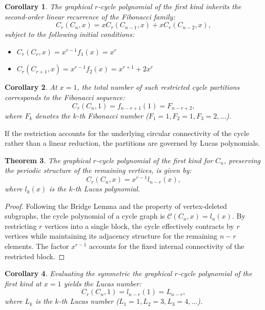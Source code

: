 \documentclass{amsart}
\newtheorem{theorem}{Theorem}[section]
\newtheorem{corollary}[theorem]{Corollary}
\theoremstyle{definition}
\begin{document}
\begin{corollary}
The graphical $r$-cycle polynomial of the first kind inherits the second-order linear recurrence of the Fibonacci family:
\begin{equation*}
    C_r(C_n, x) = x C_r(C_{n-1}, x) + x C_r(C_{n-2}, x),
\end{equation*}
subject to the following initial conditions:
\begin{itemize}
    \item $C_r(C_r, x) = x^{r-1} f_1(x) = x^r$
    \item $C_r(C_{r+1}, x) = x^{r-1} f_2(x) = x^{r+1} + 2x^r$
\end{itemize}
\end{corollary}

\begin{corollary}
At $x=1$, the total number of such restricted cycle partitions corresponds to the Fibonacci sequence:
\begin{equation*}
    C_r(C_n, 1) = f_{n-r+1}(1) = F_{n-r+2},
\end{equation*}
where $F_k$ denotes the $k$-th Fibonacci number ($F_1=1, F_2=1, F_3=2, \dots$).
\end{corollary}


If the restriction accounts for the underlying circular connectivity of the cycle rather than a linear reduction, the partitions are governed by Lucas polynomials.

\begin{theorem}
The graphical $r$-cycle polynomial of the first kind for $C_n$, preserving the periodic structure of the remaining vertices, is given by:
\begin{equation*}
    C_r(C_n, x) = x^{r-1} l_{n-r}(x),
\end{equation*}
where $l_k(x)$ is the $k$-th Lucas polynomial.
\end{theorem}

\begin{proof}
Following the Bridge Lemma and the property of vertex-deleted subgraphs, the cycle polynomial of a cycle graph is $\mathcal{C}(C_n, x) = l_n(x)$. By restricting $r$ vertices into a single block, the cycle effectively contracts by $r$ vertices while maintaining its adjacency structure for the remaining $n-r$ elements. The factor $x^{r-1}$ accounts for the fixed internal connectivity of the restricted block.
\end{proof}



\begin{corollary}
Evaluating the symmetric the graphical $r$-cycle polynomial of the first kind at $x=1$ yields the Lucas number:
\begin{equation*}
    C_r(C_n, 1) = l_{n-r}(1) = L_{n-r},
\end{equation*}
where $L_k$ is the $k$-th Lucas number ($L_1=1, L_2=3, L_3=4, \dots$).
\end{corollary}
\end{document}
